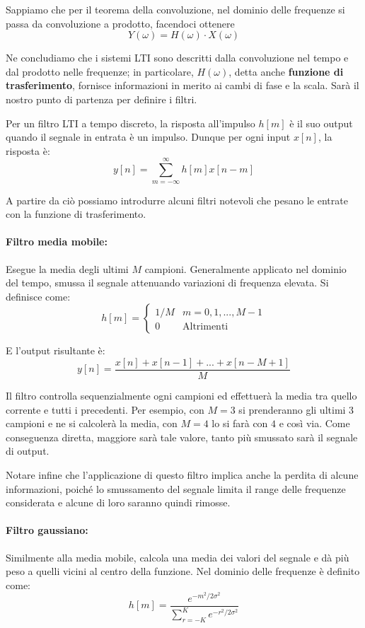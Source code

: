 \noindent Sappiamo che per il teorema della convoluzione, nel dominio delle frequenze si passa da convoluzione a prodotto, facendoci ottenere \[
	Y(\omega) = H(\omega)\cdot X(\omega)
\]

\noindent Ne concludiamo che i sistemi LTI sono descritti dalla convoluzione nel tempo e dal prodotto nelle frequenze; in particolare, $H(\omega)$,
detta anche \textbf{funzione di trasferimento}, fornisce informazioni in merito ai cambi di fase e la scala. Sarà il nostro punto di partenza per
definire i filtri.\par
Per un filtro LTI a tempo discreto, la risposta all'impulso $h[m]$ è il suo output quando il segnale in entrata è un impulso. Dunque per ogni input
$x[n]$, la risposta è: \[
	y[n] = \sum_{m = -\infty}^{\infty} h[m]x[n-m]
\]

\noindent A partire da ciò possiamo introdurre alcuni filtri notevoli che pesano le entrate con la funzione di trasferimento.

\paragraph{Filtro media mobile:} Esegue la media degli ultimi $M$ campioni. Generalmente applicato nel dominio del tempo, smussa il segnale attenuando
variazioni di frequenza elevata. Si definisce come: \[
	h[m] = \begin{cases}
		1/M & m = 0,1, ..., M-1\\
		0 & \text{Altrimenti}
	\end{cases}
\]

\noindent E l'output risultante è: \[
	y[n] = \frac{x[n] + x[n-1] + ... + x[n-M+1]}{M}
\]

\noindent Il filtro controlla sequenzialmente ogni campioni ed effettuerà la media tra quello corrente e tutti i precedenti. Per esempio, con $M=3$ si
prenderanno gli ultimi $3$ campioni e ne si calcolerà la media, con $M=4$ lo si farà con $4$ e così via. Come conseguenza diretta, maggiore sarà tale
valore, tanto più smussato sarà il segnale di output.\par
Notare infine che l'applicazione di questo filtro implica anche la perdita di alcune informazioni, poiché lo smussamento del segnale limita il range
delle frequenze considerata e alcune di loro saranno quindi rimosse.

\paragraph{Filtro gaussiano:} Similmente alla media mobile, calcola una media dei valori del segnale e dà più peso a quelli vicini al centro della
funzione. Nel dominio delle frequenze è definito come: \[
	h[m] = \frac{e^{-m^2/2\sigma^2}}{\sum_{r=-K}^K e^{-r^2/2\sigma^2}}
\]


